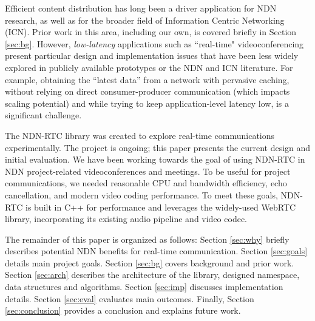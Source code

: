 \documentclass{icn/sig-alternate-2013} %
\newcommand{\ndnrtcName}{NDN-RTC} %
\newcommand{\ndnconName}{NdnCon}
\begin{document}
Efficient content distribution has long been a driver application for NDN research, as well as for the broader field of Information Centric Networking (ICN). Prior work in this area, including our own, is covered briefly in Section \ref{sec:bg}.  However, \emph{low-latency} applications such as ``real-time" videoconferencing present particular design and implementation issues that have been less widely explored in publicly available prototypes or the NDN and ICN literature.   For example, obtaining the ``latest data'' from a network with pervasive caching, without relying on direct consumer-producer communication (which impacts scaling potential) and while trying to keep application-level latency low, is a significant challenge.

The \ndnrtcName{} library was created to explore real-time communications  experimentally. %
The project is ongoing; this paper presents the current design and initial evaluation.  
We have been working towards the goal of using \ndnrtcName{} in NDN project-related videoconferences and meetings.  To be useful for project communications, we needed reasonable CPU and bandwidth efficiency, echo cancellation, and modern video coding performance. To meet these goals, \ndnrtcName{} is built in C++ for performance and leverages the widely-used WebRTC library, incorporating its existing audio pipeline and video codec. 

The remainder of this paper is organized as follows: Section \ref{sec:why} briefly describes potential NDN benefits for real-time communication. Section \ref{sec:goals} details main project goals. Section \ref{sec:bg} covers background and prior work. Section \ref{sec:arch} describes the architecture of the library, designed namespace, data structures and algorithms. Section \ref{sec:imp} discusses implementation details. Section \ref{sec:eval} evaluates main outcomes. Finally, Section \ref{sec:conclusion} provides a conclusion and explains future work.
\end{document}
